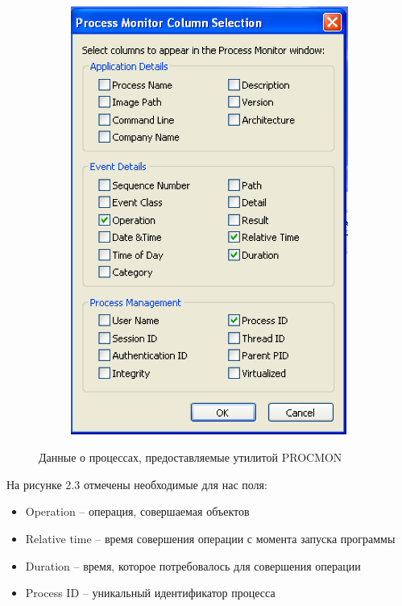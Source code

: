 \begin{figure}[ht]
	\centering
    \begin{subfigure}[b]{1\textwidth}
    \centering
        \includegraphics[scale=0.5]{procmon_columns.png}        
    \end{subfigure}
 
    \caption{Данные о процессах, предоставляемые утилитой PROCMON}
    \label{fig_parsetree}
\end{figure}

\newpage
На рисунке 2.3 отмечены необходимые для нас поля:
\begin{itemize}
\item Operation -- операция, совершаемая объектов
\item Relative time -- время совершения операции с момента запуска программы
\item Duration -- время, которое потребовалось для совершения операции
\item Process ID -- уникальный идентификатор процесса
\end{itemize}